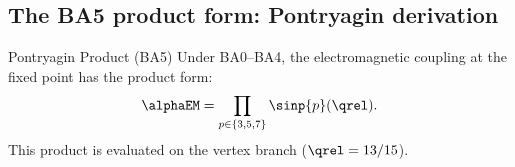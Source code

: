 \documentclass[12pt,a4paper]{article}
\begin{document}
\subsection{The BA5 product form: Pontryagin derivation}
\label{sec:ch9_BA5}

\begin{thmbox}{Pontryagin Product (BA5)}\mTHM
\label{thm:BA5}
Under BA0--BA4, the electromagnetic coupling at the fixed point has the
product form:
\begin{equation}
  \alphaEM = \prod_{p \in \{3,5,7\}} \sinp{p}(\qrel).
  \label{eq:BA5}
\end{equation}
This product is evaluated on the vertex branch ($\qrel = 13/15$).
\end{thmbox}
\end{document}
